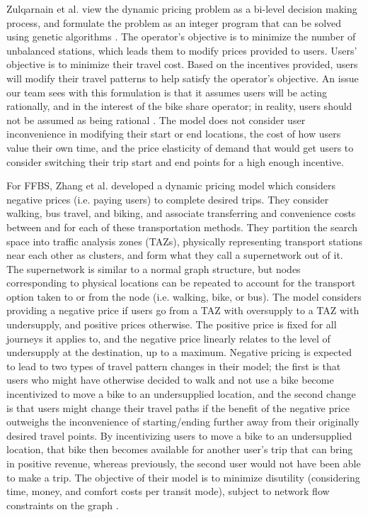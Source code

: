 \documentclass[conference]{IEEEtran}
\begin{document}
Zulqarnain et al. view the dynamic pricing problem as a bi-level decision making process, and formulate the problem as an integer program that can be solved using genetic algorithms \cite{buffalo}. The operator's objective is to minimize the number of unbalanced stations, which leads them to modify prices provided to users. Users' objective is to minimize their travel cost. Based on the incentives provided, users will modify their travel patterns to help satisfy the operator's objective. An issue our team sees with this formulation is that it assumes users will be acting rationally, and in the interest of the bike share operator; in reality, users should not be assumed as being rational \cite{kahneman}. The model does not consider user inconvenience in modifying their start or end locations, the cost of how users value their own time, and the price elasticity of demand that would get users to consider switching their trip start and end points for a high enough incentive.

For FFBS, Zhang et al. developed a dynamic pricing model which considers negative prices (i.e. paying users) to complete desired trips. They consider walking, bus travel, and biking, and associate transferring and convenience costs between and for each of these transportation methods. They partition the search space into traffic analysis zones (TAZs), physically representing transport stations near each other as clusters, and form what they call a supernetwork out of it. The supernetwork is similar to a normal graph structure, but nodes corresponding to physical locations can be repeated to account for the transport option taken to or from the node (i.e. walking, bike, or bus). The model considers providing a negative price if users go from a TAZ with oversupply to a TAZ with undersupply, and positive prices otherwise. The positive price is fixed for all journeys it applies to, and the negative price linearly relates to the level of undersupply at the destination, up to a maximum. Negative pricing is expected to lead to two types of travel pattern changes in their model; the first is that users who might have otherwise decided to walk and not use a bike become incentivized to move a bike to an undersupplied location, and the second change is that users might change their travel paths if the benefit of the negative price outweighs the inconvenience of starting/ending further away from their originally desired travel points. By incentivizing users to move a bike to an undersupplied location, that bike then becomes available for another user's trip that can bring in positive revenue, whereas previously, the second user would not have been able to make a trip. The objective of their model is to minimize disutility (considering time, money, and comfort costs per transit mode), subject to network flow constraints on the graph \cite{neg_price}.
\end{document}
